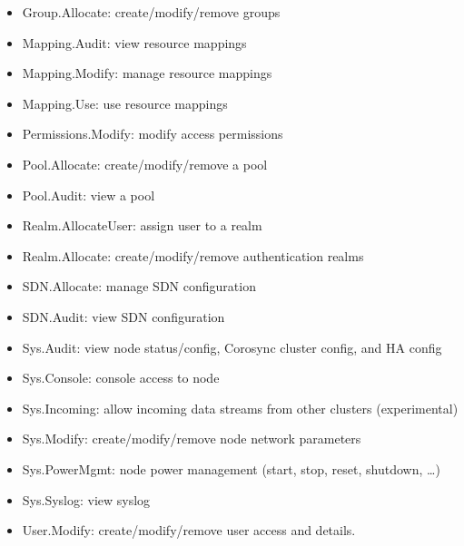\begin{itemize}[leftmargin=2cm]

	\item Group.Allocate: create/modify/remove groups

	\item Mapping.Audit: view resource mappings

	\item Mapping.Modify: manage resource mappings

	\item Mapping.Use: use resource mappings

	\item Permissions.Modify: modify access permissions

	\item Pool.Allocate: create/modify/remove a pool

	\item Pool.Audit: view a pool

	\item Realm.AllocateUser: assign user to a realm

	\item Realm.Allocate: create/modify/remove authentication realms

	\item SDN.Allocate: manage SDN configuration

	\item SDN.Audit: view SDN configuration

	\item Sys.Audit: view node status/config, Corosync cluster config, and HA config

	\item Sys.Console: console access to node

	\item Sys.Incoming: allow incoming data streams from other clusters (experimental)

	\item Sys.Modify: create/modify/remove node network parameters

	\item Sys.PowerMgmt: node power management (start, stop, reset, shutdown, …)

	\item Sys.Syslog: view syslog

	\item User.Modify: create/modify/remove user access and details.

\end{itemize}

